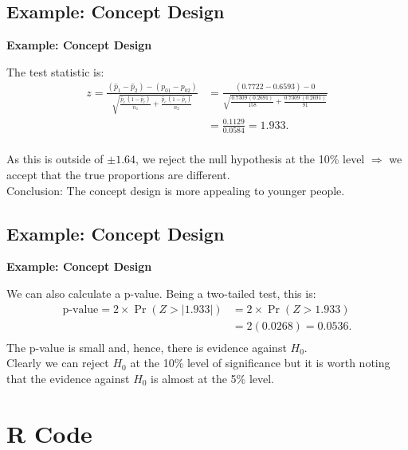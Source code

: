 \documentclass[compress]{beamer}        %
\makeatletter
\newcommand{\tcb}{\textcolor{beamer@blendedblue}}
\makeatother
\begin{document}
\subsection{Example: Concept Design}
\begin{frame}{\bf \tcb{Example: Concept Design}}

The test statistic is:\\[-0.1cm]
\begin{align*}
z= \frac{(\hat p_1 - \hat p_2) - (p_{01}-p_{02})}{\sqrt{\frac{\hat p_c\,(1-\hat p_c)}{n_1}+\frac{\hat p_c\,(1-\hat p_c)}{n_2}}} &= \frac{(0.7722 - 0.6593) - 0}{\sqrt{\frac{0.7309\,(0.2691)}{158}+\frac{0.7309\,(0.2691)}{91}}} \\[0.3cm]
&= \frac{0.1129}{0.0584} = 1.933.\\
\end{align*}

As this is outside of $\pm 1.64$, we reject the null hypothesis at the 10\% level $\Rightarrow$ we accept that the true proportions are different.\\[0.8cm]

Conclusion: The concept design is more appealing to younger people.

\end{frame}



\subsection{Example: Concept Design}
\begin{frame}{\bf \tcb{Example: Concept Design}}

We can also calculate a p-value. Being a two-tailed test, this is:\\
\begin{align*}
\text{p-value} = 2\times\Pr(Z>|1.933|) &= 2\times\Pr(Z>1.933) \\[0.2cm]
&= 2(0.0268) = 0.0536.\\[-0.2cm]
\end{align*}
The p-value is small and, hence, there is evidence against $H_0$.\\[0.8cm]

Clearly we can reject $H_0$ at the 10\% level of significance but it is worth noting that the evidence against $H_0$ is almost at the 5\% level.

\end{frame}


\section{R Code\hspace{1.5cm}}
\end{document}
